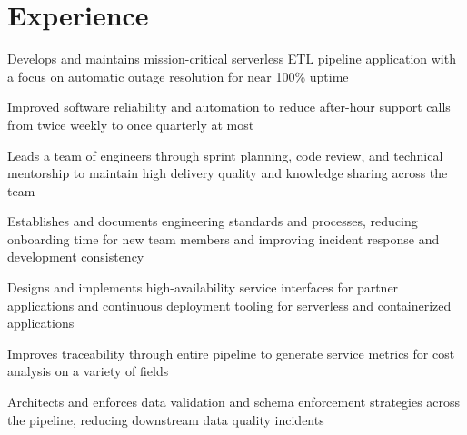 \documentclass[]{resume}
\begin{document}
\hfill
\begin{minipage}[t]{0.74\textwidth}


\section{Experience}

\vspace{\topsep} %
\begin{tightemize}
\item Develops and maintains mission-critical serverless ETL pipeline application with a focus on automatic outage resolution for near 100\% uptime
\item Improved software reliability and automation to reduce after-hour support calls from twice weekly to once quarterly at most
\item Leads a team of engineers through sprint planning, code review, and technical mentorship to maintain high delivery quality and knowledge sharing across the team
\item Establishes and documents engineering standards and processes, reducing onboarding time for new team members and improving incident response and development consistency
\item Designs and implements high-availability service interfaces for partner applications and continuous deployment tooling for serverless and containerized applications
\item Improves traceability through entire pipeline to generate service metrics for cost analysis on a variety of fields
\item Architects and enforces data validation and schema enforcement strategies across the pipeline, reducing downstream data quality incidents
\end{tightemize}


\end{minipage}
\end{document}
